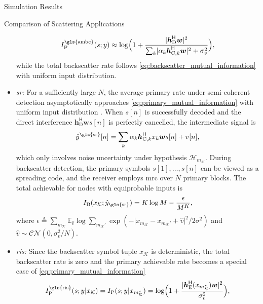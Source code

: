 \documentclass[journal]{IEEEtran}
\begin{document}
\begin{section}{Simulation Results}
\begin{subsection}{Comparison of Scattering Applications}
\begin{itemize}
			\begin{equation}
				I_{\text{P}}^{\text{\gls{ambc}}}(s;y) \approx \log \Bigl(1 + \frac{\lvert\boldsymbol{h}_{\text{D}}^\mathsf{H}\boldsymbol{w}\rvert^2}{\sum_{k}\lvert \alpha_k \boldsymbol{h}_{\text{C},k}^\mathsf{H} \boldsymbol{w}\rvert^2+\sigma_v^2}\Bigr),
			\end{equation}
			while the total backscatter rate follows \eqref{eq:backscatter_mutual_information} with uniform input distribution.
			\item \emph{\gls{sr}:} For a sufficiently large $N$, the average primary rate under semi-coherent detection asymptotically approaches \eqref{eq:primary_mutual_information} with uniform input distribution \cite{Long2020a}.
			When $s[n]$ is successfully decoded and the direct interference $\boldsymbol{h}_{\text{D}}^\mathsf{H} \boldsymbol{w} s[n]$ is perfectly cancelled, the intermediate signal is
			\begin{equation}
				\hat{y}^{\text{\gls{sr}}}[n] = \sum_{k} \alpha_k \boldsymbol{h}_{\text{C},k}^\mathsf{H} x_k \boldsymbol{w} s[n] + v[n],
				\label{eq:intermediate_signal}
			\end{equation}
			which only involves noise uncertainty under hypothesis $\mathcal{H}_{m_{\mathcal{K}}}$.
			During backscatter detection, the primary symbols $s[1],\ldots,s[n]$ can be viewed as a spreading code, and the receiver employs \gls{mrc} over $N$ primary blocks.
			The total achievable for nodes with equiprobable inputs is \cite{Wang2014a}
			\begin{equation}
				I_{\text{B}}(x_{\mathcal{K}};\hat{y}_{\text{\gls{sr}}}) = K \log M - \frac{\epsilon}{M^K},
			\end{equation}
			where $\epsilon \triangleq \sum_{m_{\mathcal{K}}} \mathbb{E}_{\hat{v}} \log \sum_{m_{\mathcal{K}}'} \exp ( - {\lvert x_{m_{\mathcal{K}}} - x_{m_{\mathcal{K}}'} + \hat{v} \rvert^2}/{2 \sigma^2} )$ and $\hat{v} \sim \mathcal{CN}(0,\sigma_v^2/N)$.
			\item \emph{\gls{ris}:} Since the backscatter symbol tuple $x_{\mathcal{K}}$ is deterministic, the total backscatter rate is zero and the primary achievable rate becomes a special case of \eqref{eq:primary_mutual_information}
			\begin{equation}
				I_{\text{P}}^{\text{\gls{ris}}}(s;y|x_{\mathcal{K}}) = I_{\text{P}}(s;y|x_{m_{\mathcal{K}}^{\star}}) = \log \Bigl(1 + \frac{\lvert \boldsymbol{h}_{\text{E}}^\mathsf{H}(x_{m_{\mathcal{K}}^{\star}}) \boldsymbol{w} \rvert^2}{\sigma_v^2}\Bigr),

\end{equation}
\end{itemize}
\end{subsection}
\end{section}
\end{document}
